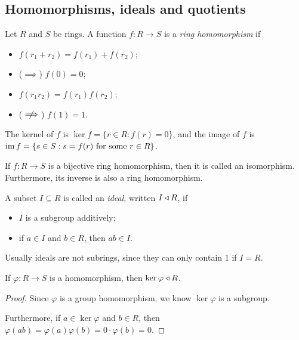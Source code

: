 \documentclass{../template/note}
\begin{document}
    \subsection{Homomorphisms, ideals and quotients}

    \begin{definition}
        Let $R$ and $S$ be rings. A function $f: R \to S$ is a \emph{ring homomorphism} if
        \begin{itemize}
            \item $f(r_1 + r_2) = f(r_1) + f(r_2)$;
            \item ($\implies$) $f(0) = 0$;
            \item $f(r_1r_2) = f(r_1)f(r_2)$;
            \item ($\centernot\implies$) $f(1) = 1$.
        \end{itemize}
        The kernel of $f$ is $\ker f = \{r \in R : f(r) = 0\}$, and the image of $f$ is $\operatorname{im} f = \{s \in S: s = f(r) \text{ for some }r \in R\}$.
    \end{definition}
    
    \begin{definition}
        If $f: R \to S$ is a bijective ring homomorphism, then it is called an isomorphism. Furthermore, its inverse is also a ring homomorphism.
    \end{definition}
    
    \begin{definition}
        A subset $I \subseteq R$ is called an \emph{ideal}, written $I \triangleleft R$, if
        \begin{itemize}
            \item $I$ is a subgroup additively;
            \item if $a \in I$ and $b \in R$, then $ab \in I$.
        \end{itemize}
        Usually ideals are not subrings, since they can only contain 1 if $I = R$.        
    \end{definition}
    
    \begin{lemma}
        If $\varphi: R \to S$ is a homomorphism, then $\ker \varphi \triangleleft R$.
    \end{lemma}
    
    \begin{proof}
        Since $\varphi$ is a group homomorphism, we know $\ker \varphi$ is a subgroup.

        Furthermore, if $a \in \ker \varphi$ and $b \in R$, then $\varphi(ab) = \varphi(a)\varphi(b) = 0 \cdot \varphi(b) = 0$.
    \end{proof}
    
\end{document}
